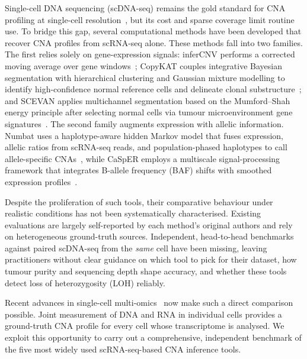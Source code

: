 \documentclass[11pt]{article}
\begin{document}
Single-cell DNA sequencing (scDNA-seq) remains the gold standard for CNA
profiling at single-cell resolution~\cite{navin2011tumor,gawad2016singlecell},
but its cost and sparse coverage limit routine use. To bridge this gap,
several computational methods have been developed that recover CNA profiles
from scRNA-seq alone. These methods fall into two families. The first relies
solely on gene-expression signals: inferCNV performs a corrected moving
average over gene windows~\cite{tickle2019infercnv}; CopyKAT couples
integrative Bayesian segmentation with hierarchical clustering and Gaussian
mixture modelling to identify high-confidence normal reference cells and
delineate clonal substructure~\cite{gao2021copykat}; and SCEVAN applies
multichannel segmentation based on the Mumford--Shah energy principle after
selecting normal cells via tumour microenvironment gene
signatures~\cite{defalco2023scevan}. The second family augments expression
with allelic information. Numbat uses a haplotype-aware hidden Markov model
that fuses expression, allelic ratios from scRNA-seq reads, and
population-phased haplotypes to call allele-specific
CNAs~\cite{gao2023numbat}, while CaSpER employs a multiscale
signal-processing framework that integrates B-allele frequency (BAF) shifts
with smoothed expression profiles~\cite{serin2020casper}.

Despite the proliferation of such tools, their comparative behaviour under
realistic conditions has not been systematically characterised. Existing
evaluations are largely self-reported by each method's original authors and
rely on heterogeneous ground-truth sources. Independent, head-to-head
benchmarks against paired scDNA-seq from the \emph{same} cell have been
missing, leaving practitioners without clear guidance on which tool to pick
for their dataset, how tumour purity and sequencing depth shape accuracy, and
whether these tools detect loss of heterozygosity (LOH) reliably.

Recent advances in single-cell multi-omics~\cite{macaulay2015gtseq,
zachariadis2020dntrseq,zhou2020singlecell} now make such a direct comparison
possible. Joint measurement of DNA and RNA in individual cells provides a
ground-truth CNA profile for every cell whose transcriptome is analysed. We
exploit this opportunity to carry out a comprehensive, independent benchmark
of the five most widely used scRNA-seq-based CNA inference tools.
\end{document}

